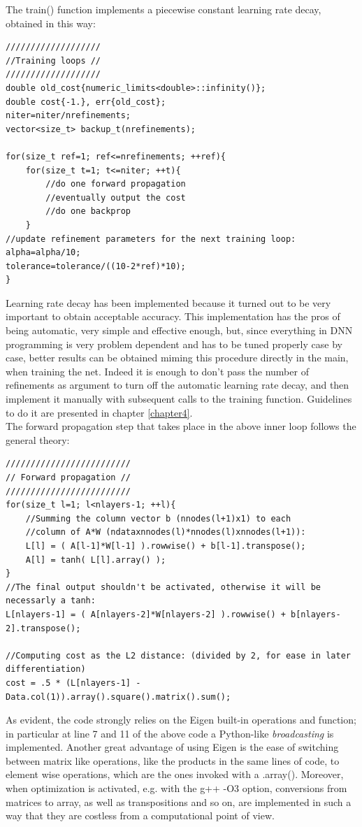 \documentclass[12pt, a4paper]{report}
\theoremstyle{definition}
\begin{document}
The {\ttfamily train()} function implements a piecewise constant learning rate decay, obtained in this way:
\begin{lstlisting}[frame=single]
///////////////////
//Training loops //
///////////////////
double old_cost{numeric_limits<double>::infinity()};
double cost{-1.}, err{old_cost};
niter=niter/nrefinements;
vector<size_t> backup_t(nrefinements);
	
for(size_t ref=1; ref<=nrefinements; ++ref){
	for(size_t t=1; t<=niter; ++t){
		//do one forward propagation
		//eventually output the cost
		//do one backprop
	}
//update refinement parameters for the next training loop:
alpha=alpha/10;
tolerance=tolerance/((10-2*ref)*10);
} 
\end{lstlisting} 
Learning rate decay has been implemented because it turned out to be very important to obtain acceptable accuracy. This implementation has the pros of being automatic, very simple and effective enough, but, since everything in DNN programming is very problem dependent and has to be tuned properly case by case, better results can be obtained miming this procedure directly in the main, when training the net. Indeed it is enough to don't pass the number of refinements as argument to turn off the automatic learning rate decay, and then implement it manually with subsequent calls to the training function. Guidelines to do it are presented in chapter \ref{chapter4}.\\
The forward propagation step that takes place in the above inner loop follows the general theory:
\begin{lstlisting}[frame=single]
/////////////////////////
// Forward propagation //
/////////////////////////
for(size_t l=1; l<nlayers-1; ++l){
	//Summing the column vector b (nnodes(l+1)x1) to each 
	//column of A*W (ndataxnnodes(l)*nnodes(l)xnnodes(l+1)):
	L[l] = ( A[l-1]*W[l-1] ).rowwise() + b[l-1].transpose();
	A[l] = tanh( L[l].array() );
}	
//The final output shouldn't be activated, otherwise it will be necessarly a tanh:
L[nlayers-1] = ( A[nlayers-2]*W[nlayers-2] ).rowwise() + b[nlayers-2].transpose();
	
//Computing cost as the L2 distance: (divided by 2, for ease in later differentiation)
cost = .5 * (L[nlayers-1] - Data.col(1)).array().square().matrix().sum();
\end{lstlisting}
As evident, the code strongly relies on the Eigen built-in operations and function; in particular at line 7 and 11 of the above code a Python-like \textit{broadcasting} is implemented. Another great advantage of using Eigen is the ease of switching between matrix like operations, like the products in the same lines of code, to element wise operations, which are the ones invoked with a {\ttfamily .array()}. Moreover, when optimization is activated, e.g. with the {\ttfamily g++ -O3} option, conversions from matrices to array, as well as transpositions and so on, are implemented in such a way that they are costless from a computational point of view.\\
\end{document}
